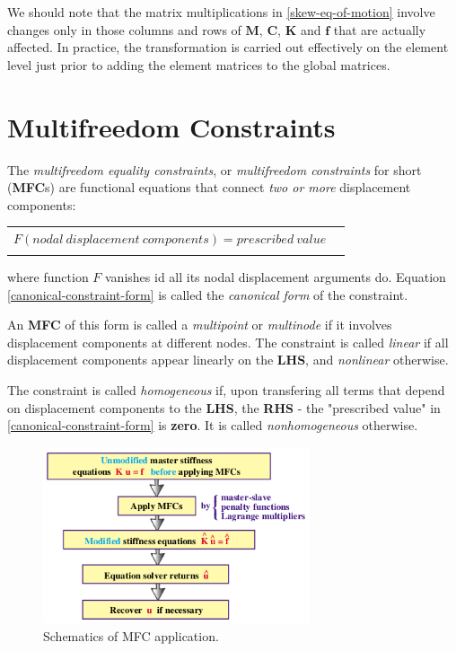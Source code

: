 \documentclass[10pt,b5paper,titlepage]{book}
\newenvironment{bbox}[1][0.96]
{
    \begin{center}
        \begin{tabular}{|p{#1\textwidth}|}
            \hline\\
}
{
            \\\\\hline
        \end{tabular}
    \end{center}
}
\begin{document}
We should note that the matrix multiplications in \eqref{skew-eq-of-motion}
involve changes only in those columns and rows of $ \mathbf{M} $, $ \mathbf{C} $,
$ \mathbf{K} $ and $ \mathbf{f} $ that are actually affected. In practice,
the transformation is carried out effectively on the element level just prior
to adding the element matrices to the global matrices.


\newpage
\chapter{Multifreedom Constraints}

The \textit{multifreedom equality constraints}, or \textit{multifreedom constraints}
for short (\textbf{MFC}s) are functional equations that connect
\textit{two or more} displacement components:

\begin{bbox}
    \begin{equation}\label{canonical-constraint-form}
        F(nodal\ displacement\ components) = prescribed\ value \quad
    \end{equation}
\end{bbox}

where function $ F $ vanishes id all its nodal displacement arguments do.
Equation \eqref{canonical-constraint-form} is called the
\textit{canonical form} of the constraint.

An \textbf{MFC} of this form is called a \textit{multipoint} or \textit{multinode}
if it involves displacement components at different nodes. The constraint is
called \textit{linear} if all displacement components appear linearly on the
\textbf{LHS}, and \textit{nonlinear} otherwise.

The constraint is called \textit{homogeneous} if, upon transfering all terms
that depend on displacement components to the \textbf{LHS}, the \textbf{RHS} -
the "prescribed value" in \eqref{canonical-constraint-form} is \textbf{zero}.
It is called \textit{nonhomogeneous} otherwise.


\begin{figure}[ht]
    \centering
    \includegraphics[width=0.70\textwidth]{img/mfc_schematic.png}
    \caption{Schematics of MFC application.}
    \label{fig:MFC-schematic}
\end{figure}
\end{document}
